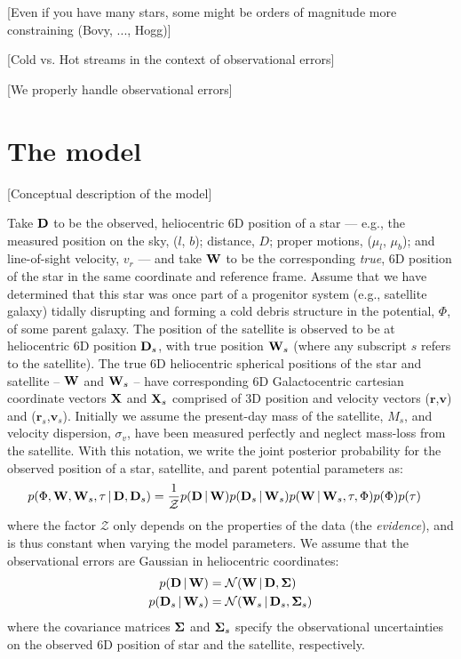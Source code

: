 \documentclass[letterpaper,12pt,preprint]{aastex}
\newcommand{\given}{\,|\,}
\newcommand{\D}{{\bf D}}
\newcommand{\W}{{\bf W}}
\newcommand{\X}{{\bf X}}
\newcommand{\bSigma}{{\bf \Sigma}}
\newcommand{\bsr}{\boldsymbol r}
\newcommand{\bsv}{\boldsymbol v}
\begin{document}
[Even if you have many stars, some might be orders of magnitude more constraining (Bovy, ..., Hogg)]

[Cold vs. Hot streams in the context of observational errors]

[We properly handle observational errors]

\section{The model}

[Conceptual description of the model]

Take $\D$ to be the observed, heliocentric 6D position of a star --- e.g., the measured position on the sky, ($l$, $b$); distance, $D$; proper motions, ($\mu_l$, $\mu_b$); and line-of-sight velocity, $v_r$ --- and take $\W$ to be the corresponding \emph{true}, 6D position of the star in the same coordinate and reference frame. Assume that we have determined that this star was once part of a progenitor system (e.g., satellite galaxy) tidally disrupting and forming a cold debris structure in the potential, $\Phi$, of some parent galaxy. The position of the satellite is observed to be at heliocentric 6D position $\D_s$, with true position $\W_s$ (where any subscript $s$ refers to the satellite). The true 6D heliocentric spherical positions of the star and satellite -- $\W$ and $\W_s$ -- have corresponding 6D Galactocentric cartesian coordinate vectors $\X$ and $\X_s$ comprised of 3D position and velocity vectors ($\bsr$,$\bsv$) and ($\bsr_s$,$\bsv_s$). Initially we assume the present-day mass of the satellite, $M_s$, and velocity dispersion, $\sigma_v$, have been measured perfectly and neglect mass-loss from the satellite. With this notation, we write the joint posterior probability for the observed position of a star, satellite, and parent potential parameters as:
\begin{align}
	p(\Phi, \W, \W_s, \tau \given \D, \D_s) &= \frac{1}{\mathcal{Z}} p(\D \given \W) p(\D_s \given \W_s) 
												       p(\W \given \W_s, \tau, \Phi) 
												       p(\Phi) p(\tau)
\end{align}
where the factor $\mathcal{Z}$ only depends on the properties of the data (the \emph{evidence}), and is thus constant when varying the model parameters. We assume that the observational errors are Gaussian in heliocentric coordinates:
\begin{align}
	p(\D \given \W) &= \mathcal{N}(\W \given \D, \bSigma)\\
	p(\D_s \given \W_s) &= \mathcal{N}(\W_s \given \D_s, \bSigma_s)
\end{align}
where the covariance matrices $\bSigma$ and $\bSigma_s$ specify the observational uncertainties on the observed 6D position of star and the satellite, respectively. 
\end{document}
